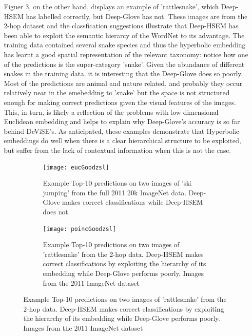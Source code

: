\documentclass[12pt]{report}
\begin{document}
Figuer \ref{fig:poincgoodzsl}, on the other hand, displays an example of 'rattlesnake', which Deep-HSEM has labelled correctly, but Deep-Glove has not. These images are from the 2-hop dataset and the classfication suggestions illustrate that Deep-HSEM has been able to exploit the semantic hierarcy of the WordNet to its advantage. The training data contained several snake species and thus the hyperbolic embedding has learnt a good spatial representation of the relevant taxonomy: notice how one of the predictions is the super-category 'snake'. Given the abundance of different snakes in the training data, it is interesting that the Deep-Glove does so poorly. Most of the predictions are animal and nature related, and probably they occur relatively near in the emebedding to 'snake' but the space is not structured enough for making correct predictions given the visual features of the images. This, in turn, is likely a reflection of the problems with low dimensional Euclidean embedding and helps to explain why Deep-Glove's accuracy is so far behind DeViSE's. As anticipated, these examples demonstrate that Hyperbolic embeddings do well when there is a clear hierarchical structure to be exploited, but suffer from the lack of contextual information when this is not the case.

\begin{figure}
  \centering
  \begin{subfigure}[b]{0.9\textwidth}
  \texttt{[image: eucGoodzsl]}
  \caption{Example Top-10 predictions on two images of 'ski jumping' from the full 2011 20k ImageNet data. Deep-Glove makes correct classifications while Deep-HSEM does not}
  \label{fig:eucgoodzsl}
\end{subfigure}

\begin{subfigure}[b]{0.9\textwidth}
  \texttt{[image: poincGoodzsl]}
  \caption{Example Top-10 predictions on two images of 'rattlesnake' from the 2-hop data. Deep-HSEM makes correct classifications by exploiting the hierarchy of its embedding while Deep-Glove performs poorly. Images from the 2011 ImageNet dataset \cite{JiaDeng2009}}
  \label{fig:poincgoodzsl}
\end{subfigure}
\end{figure}
\end{document}
